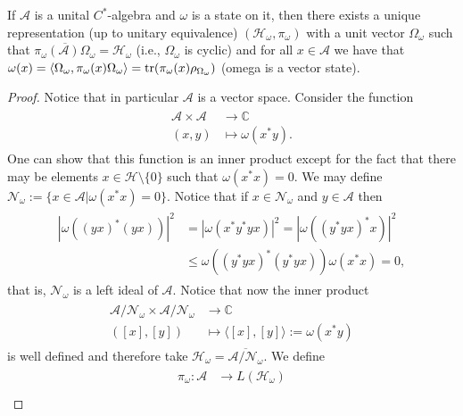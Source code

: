 \begin{theorem}
If $\mathcal{A}$ is a unital $C^*$-algebra and $\omega$ is a state on it, then there exists a unique representation (up to unitary equivalence) $(\mathcal{H}_\omega,\pi_\omega)$ with a unit vector $\Omega_\omega$ such that $\overline{\pi_\omega(\mathcal{A})\Omega_\omega}=\mathcal{H}_\omega$ (i.e., $\Omega_\omega$ is cyclic) and for all $x\in\mathcal{A}$ we have that $\omega(x)=\langle\Omega_\omega,\pi_\omega(x)\Omega_\omega\rangle=\operatorname{tr}(\pi_\omega(x)\rho_{\Omega_\omega})$ (omega is a vector state).  
\end{theorem}

\begin{proof}
Notice that in particular $\mathcal{A}$ is a vector space. Consider the function
\begin{align}
\begin{split}
\mathcal{A}\times\mathcal{A}&\rightarrow\mathbb{C} \\
(x,y)&\mapsto\omega(x^*y).
\end{split}
\end{align}
One can show that this function is an inner product except for the fact that there may be elements $x\in\mathcal{H}\setminus\{0\}$ such that $\omega(x^*x)=0$. We may define $\mathcal{N}_\omega := \{x\in\mathcal{A}|\omega(x^*x)=0\}$. Notice that if $x\in\mathcal{N}_\omega$ and $y\in\mathcal{A}$ then 
\begin{align}
\begin{split}
|\omega((yx)^*(yx))|^2&=|\omega(x^*y^*yx)|^2=|\omega((y^*yx)^*x)|^2 \\
&\leq\omega((y^*yx)^*(y^*yx))\omega(x^*x)=0,
\end{split}
\end{align}
that is, $\mathcal{N}_\omega$ is a left ideal of $\mathcal{A}$. Notice that now the inner product
\begin{align}
\begin{split}
\mathcal{A}/\mathcal{N}_\omega\times\mathcal{A}/\mathcal{N}_\omega&\rightarrow\mathbb{C} \\
([x],[y])&\mapsto\langle[x],[y]\rangle:=\omega(x^*y)
\end{split}
\end{align}
is well defined and therefore take $\mathcal{H}_\omega=\overline{\mathcal{A}/\mathcal{N}_\omega}$. We define 
\begin{align}
\begin{split}
\pi_\omega:\mathcal{A}&\rightarrow L(\mathcal{H}_\omega) \\

\end{split}
\end{align}
\end{proof}
